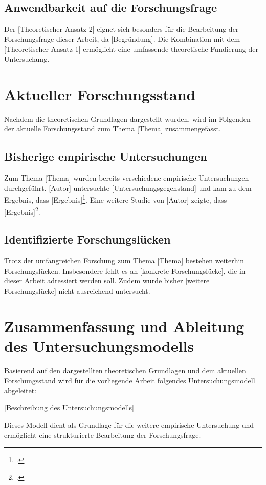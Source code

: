 \subsection{Anwendbarkeit auf die Forschungsfrage}
\label{subsec:anwendbarkeit}

Der [Theoretischer Ansatz 2] eignet sich besonders für die Bearbeitung der Forschungsfrage dieser Arbeit, da [Begründung]. Die Kombination mit dem [Theoretischer Ansatz 1] ermöglicht eine umfassende theoretische Fundierung der Untersuchung.

\section{Aktueller Forschungsstand}
\label{sec:forschungsstand}

Nachdem die theoretischen Grundlagen dargestellt wurden, wird im Folgenden der aktuelle Forschungsstand zum Thema [Thema] zusammengefasst.

\subsection{Bisherige empirische Untersuchungen}
\label{subsec:bisherige_untersuchungen}

Zum Thema [Thema] wurden bereits verschiedene empirische Untersuchungen durchgeführt. [Autor] untersuchte [Untersuchungsgegenstand] und kam zu dem Ergebnis, dass [Ergebnis]\footcite[S. XX]{Quelle8}. Eine weitere Studie von [Autor] zeigte, dass [Ergebnis]\footcite[S. XX]{Quelle9}.

\subsection{Identifizierte Forschungslücken}
\label{subsec:forschungsluecken}

Trotz der umfangreichen Forschung zum Thema [Thema] bestehen weiterhin Forschungslücken. Insbesondere fehlt es an [konkrete Forschungslücke], die in dieser Arbeit adressiert werden soll. Zudem wurde bisher [weitere Forschungslücke] nicht ausreichend untersucht.

\section{Zusammenfassung und Ableitung des Untersuchungsmodells}
\label{sec:zusammenfassung_modell}

Basierend auf den dargestellten theoretischen Grundlagen und dem aktuellen Forschungsstand wird für die vorliegende Arbeit folgendes Untersuchungsmodell abgeleitet:

[Beschreibung des Untersuchungsmodells]

Dieses Modell dient als Grundlage für die weitere empirische Untersuchung und ermöglicht eine strukturierte Bearbeitung der Forschungsfrage.